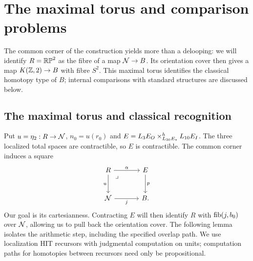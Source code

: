 \section{The maximal torus and comparison problems}\label{sec:outlook}

The common corner of the construction yields more than a delooping: we will identify $R=\mathbb{RP}^2$ as the fibre of a map $\mathcal N\to B$. Its orientation cover then gives a map $K(\mathbb Z,2)\to B$ with fibre $S^2$. This maximal torus identifies the classical homotopy type of $B$; internal comparisons with standard structures are discussed below.

\subsection{The maximal torus and classical recognition}

Put $u=\eta_2:R\to\mathcal N$, $n_0=u(r_0)$ and $E=L_3E_O\mathbin{\times}^{h}_{L_{30}E_*}L_{10}E_I$. The three localized total spaces are contractible, so $E$ is contractible. The common corner induces a square
\begin{equation}\label{diag:HP}
\begin{tikzcd}[column sep=large,row sep=large]
R \arrow[r,"\alpha"] \arrow[d,"u"'] \pbmark & E \arrow[d,"p"] \\
\baseN \arrow[r,"j"'] & B.
\end{tikzcd}
\end{equation}
Our goal is its cartesianness. Contracting $E$ will then identify $R$ with $\operatorname{fib}(j,b_0)$ over $\mathcal N$, allowing us to pull back the orientation cover. The following lemma isolates the arithmetic step, including the specified overlap path. We use localization HIT recursors with judgmental computation on units; computation paths for homotopies between recursors need only be propositional.

